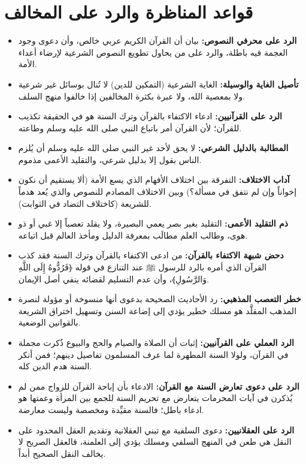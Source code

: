 \section{قواعد المناظرة والرد على المخالف}
\begin{itemize}
    \item \textbf{الرد على محرفي النصوص:} بيان أن القرآن الكريم عربي خالص، وأن دعوى وجود العجمة فيه باطلة، والرد على من يحاول تطويع النصوص الشرعية لإرضاء أعداء الأمة.
    \item \textbf{تأصيل الغاية والوسيلة:} الغاية الشرعية (التمكين للدين) لا تُنال بوسائل غير شرعية ولا بمعصية الله، ولا عبرة بكثرة المخالفين إذا خالفوا منهج السلف.
    \item \textbf{الرد على القرآنيين:} ادعاء الاكتفاء بالقرآن وترك السنة هو في الحقيقة تكذيب للقرآن؛ لأن القرآن أمر باتباع النبي صلى الله عليه وسلم وطاعته.
    \item \textbf{المطالبة بالدليل الشرعي:} لا يحق لأحد غير النبي صلى الله عليه وسلم أن يُلزم الناس بقول إلا بدليل شرعي، والتقليد الأعمى مذموم.
    \item \textbf{آداب الاختلاف:} التفرقة بين اختلاف الأفهام الذي يسع الأمة (ألا يستقيم أن نكون إخواناً وإن لم نتفق في مسألة؟) وبين الاختلاف المصادم للنصوص والذي يُعد هدماً للشريعة (كاختلاف التضاد في الثوابت).
    \item \textbf{ذم التقليد الأعمى:} التقليد بغير بصر يعمي البصيرة، ولا يقلد تعصباً إلا غبي أو ذو هوى، وطالب العلم مطالَب بمعرفة الدليل ومأخذ العالم قبل اتباعه.
    \item \textbf{دحض شبهة الاكتفاء بالقرآن:} من ادعى الاكتفاء بالقرآن وترك السنة فقد كذب القرآن الذي أمره بالرد للرسول ﷺ عند التنازع في قوله ﴿فَرُدُّوهُ إِلَى اللَّهِ وَالرَّسُولِ﴾، وأن عدم التسليم لقضائه ينفي أصل الإيمان.
    \item \textbf{خطر التعصب المذهبي:} رد الأحاديث الصحيحة بدعوى أنها منسوخة أو مؤولة لنصرة المذهب المقلَّد هو مسلك خطير يؤدي إلى إضاعة السنن وتسهيل اختراق الشريعة بالقوانين الوضعية.
    \item \textbf{الرد العملي على القرآنيين:} إثبات أن الصلاة والصيام والحج والبيوع ذُكرت مجملة في القرآن، ولولا السنة المطهرة لما عرف المسلمون تفاصيل دينهم؛ فمن أنكر السنة هدم الدين كله.
    \item \textbf{الرد على دعوى تعارض السنة مع القرآن:} الادعاء بأن إباحة القرآن للزواج ممن لم يُذكرن في آيات المحرمات يتعارض مع تحريم السنة للجمع بين المرأة وعمتها هو ادعاء باطل؛ فالسنة مقيِّدة ومخصصة وليست معارضة.
    \item \textbf{الرد على العقلانيين:} دعوى السلفية مع تبني العقلانية وتقديم العقل المحدود على النقل هي طعن في المنهج السلفي ومسلك يؤدي إلى العلمنة، فالعقل الصريح لا يخالف النقل الصحيح أبداً.

\end{itemize}
